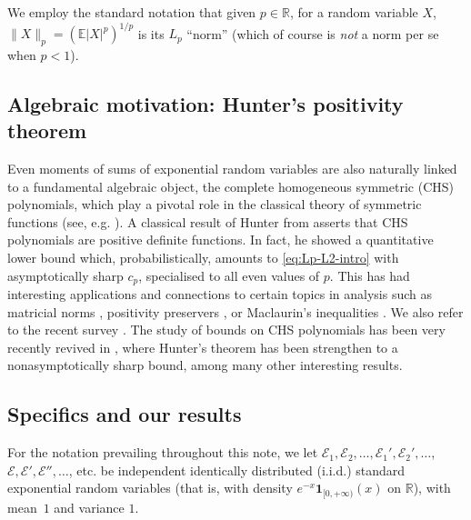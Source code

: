 \documentclass[10pt]{article}
\newcommand{\E}{\mathbb{E}}
\newcommand{\1}{\textbf{1}}
\newcommand{\R}{\mathbb{R}}
\newcommand{\cE}{\mathscr{E}}
\theoremstyle{remark}
\theoremstyle{definition}
\begin{document}
We employ the standard notation that given $p \in \R$, for a random variable $X$, $\|X\|_p = (\E|X|^p)^{1/p}$ is its $L_p$ ``norm'' (which of course is \emph{not} a norm per se when $p < 1$).



\subsection{Algebraic motivation: Hunter's positivity theorem}
Even moments of sums of exponential random variables are also naturally linked to a fundamental algebraic object, the complete homogeneous symmetric (CHS) polynomials, which play a pivotal role in the classical theory of symmetric functions (see, e.g. \cite{Mac}). A classical result of Hunter from \cite{Hun} asserts that CHS polynomials are positive definite functions. In fact, he showed a quantitative lower bound which, probabilistically, amounts to \eqref{eq:Lp-L2-intro} with asymptotically sharp $c_p$, specialised to all even values of $p$. This has had interesting applications and connections to certain topics in analysis such as matricial norms \cite{ACGV}, positivity preservers \cite{KT}, or Maclaurin's inequalities \cite{Tao}. We also refer to the recent survey \cite{BCG}. The study of bounds on CHS polynomials has been very recently revived in \cite{BP}, where Hunter's theorem has been strengthen to a nonasymptotically sharp bound, among many other interesting results.


\subsection{Specifics and our results}

For the notation prevailing throughout this note, we let $\cE_1, \cE_2, \dots, \cE_1', \cE_2', \dots$, $\cE, \cE', \cE'', \dots$, etc. be independent identically distributed (i.i.d.) standard exponential random variables (that is, with density $e^{-x}\1_{[0,+\infty)}(x)$ on $\R$), with mean~$1$ and variance $1$.
\end{document}
